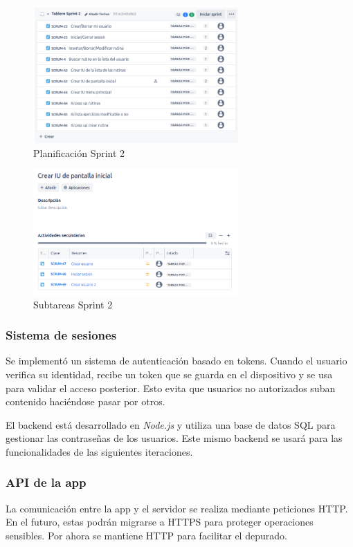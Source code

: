 \begin{figure}[h!]
  \centering
  \includegraphics[width=0.7\textwidth]{fotos/PreSprint2.png}
  \caption{Planificaci\'on Sprint 2}
  \label{fig:pre_sprint2}
\end{figure}

\begin{figure}[h!]
  \centering
  \includegraphics[width=0.7\textwidth]{fotos/SubListPre2.png}
  \caption{Subtareas Sprint 2}
  \label{fig:sublist_pre2}
\end{figure}

\subsubsection*{Sistema de sesiones}
Se implement\'o un sistema de autenticaci\'on basado en tokens. Cuando el usuario verifica su identidad, recibe un token que se guarda en el dispositivo y se usa para validar el acceso posterior. Esto evita que usuarios no autorizados suban contenido haci\'endose pasar por otros.

El backend est\'a desarrollado en \textit{Node.js} y utiliza una base de datos SQL para gestionar las contrase\~nas de los usuarios. Este mismo backend se usar\'a para las funcionalidades de las siguientes iteraciones.

\subsubsection*{API de la app}
La comunicaci\'on entre la app y el servidor se realiza mediante peticiones HTTP. En el futuro, estas podr\'an migrarse a HTTPS para proteger operaciones sensibles. Por ahora se mantiene HTTP para facilitar el depurado.

